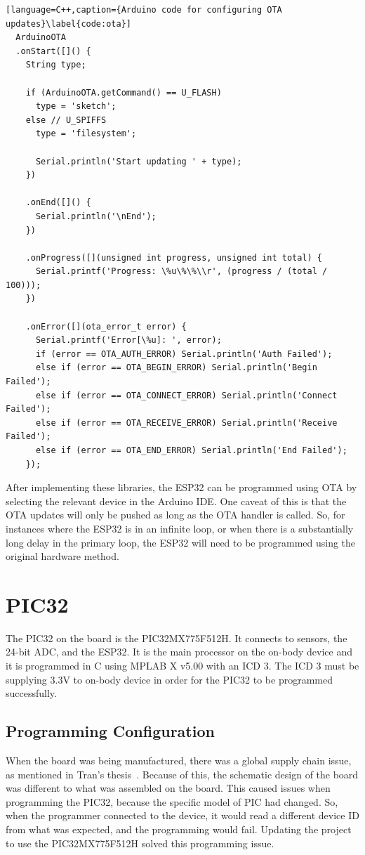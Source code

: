 \begin{lstlisting}[language=C++,caption={Arduino code for configuring OTA updates}\label{code:ota}]
  ArduinoOTA
  .onStart([]() {
    String type;

    if (ArduinoOTA.getCommand() == U_FLASH)
      type = 'sketch';
    else // U_SPIFFS
      type = 'filesystem';

      Serial.println('Start updating ' + type);
    })

    .onEnd([]() {
      Serial.println('\nEnd');
    })

    .onProgress([](unsigned int progress, unsigned int total) {
      Serial.printf('Progress: \%u\%\%\\r', (progress / (total / 100)));
    })

    .onError([](ota_error_t error) {
      Serial.printf('Error[\%u]: ', error);
      if (error == OTA_AUTH_ERROR) Serial.println('Auth Failed');
      else if (error == OTA_BEGIN_ERROR) Serial.println('Begin Failed');
      else if (error == OTA_CONNECT_ERROR) Serial.println('Connect Failed');
      else if (error == OTA_RECEIVE_ERROR) Serial.println('Receive Failed');
      else if (error == OTA_END_ERROR) Serial.println('End Failed');
    });

\end{lstlisting}

After implementing these libraries, the ESP32 can be programmed using OTA by selecting the relevant device in the Arduino IDE.
One caveat of this is that the OTA updates will only be pushed as long as the OTA handler is called.
So, for instances where the ESP32 is in an infinite loop, or when there is a substantially long delay in the primary loop,
the ESP32 will need to be programmed using the original hardware method.


\section{PIC32}
The PIC32 on the board is the PIC32MX775F512H.
It connects to sensors, the 24-bit ADC, and the ESP32.
It is the main processor on the on-body device and it is programmed in C using MPLAB X v5.00 with an ICD 3.
The ICD 3 must be supplying 3.3V to on-body device in order for the PIC32 to be programmed successfully.

\subsection{Programming Configuration}
When the board was being manufactured, there was a global supply chain issue, as mentioned in Tran's thesis~\cite{Tran:2022}.
Because of this, the schematic design of the board was different to what was assembled on the board.
This caused issues when programming the PIC32, because the specific model of PIC had changed.
So, when the programmer connected to the device, it would read a different device ID from what was expected,
and the programming would fail.
Updating the project to use the PIC32MX775F512H solved this programming issue.

